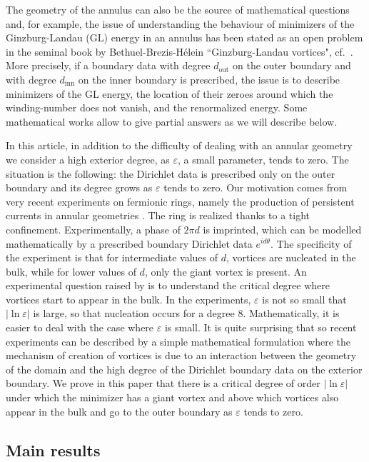\documentclass[12pt,reqno]{amsart}
\def\e {{\varepsilon}}
\numberwithin{equation}{section}
\begin{document}
 The geometry of the annulus can also be the source of mathematical questions and, for example, the issue of understanding the behaviour of minimizers of the Ginzburg-Landau (GL) energy in an annulus has been stated as an open problem in the seminal book by  Bethuel-Brezis-H\'elein  ``Ginzburg-Landau vortices", cf.\ \cite[Problem 3, Chap. XI]{BBH}. More precisely, if a boundary data with degree $d_{\text{out}}$ on the outer boundary and with degree \(d_{\text{inn}}\) on the inner boundary is prescribed, the
 issue is to describe minimizers of the GL energy, the location of their zeroes around which the winding-number does not vanish, and the renormalized energy. Some mathematical works allow to give partial answers as we will describe below. 
  
  In this article, in addition to the difficulty of dealing with an annular geometry we consider a high exterior degree, as $\e$, a small parameter, tends to zero. The situation is the following: the Dirichlet data is prescribed only on the outer boundary and its degree grows as \(\e\) tends to zero. Our motivation comes from very recent experiments on fermionic rings, namely the production of persistent currents in annular geometries \cite{cai2022,Roati}. The ring is realized thanks to a tight confinement. Experimentally, a phase of $2\pi d$  is imprinted, which can be  modelled mathematically by a prescribed boundary Dirichlet data $e^{id\theta}$. The specificity of the experiment is that for intermediate values of $d$, vortices are nucleated in the bulk, while for lower values of $d$, only the giant vortex is present. An experimental question raised by \cite{cai2022,Roati} is to understand the critical degree where vortices start to appear in the bulk. In the experiments, $\e$ is not so small that $|\ln \e|$ is large, so that  nucleation occurs for a degree 8. Mathematically, it is easier to deal with the case where $\e$ is small. It is quite surprising that so recent experiments can be described by a simple mathematical formulation where the mechanism of creation of vortices is due to an interaction between the geometry of the domain and the high degree of the Dirichlet boundary data on the exterior boundary. We prove in this paper that there is a critical degree of order $|\ln \e|$  under which the minimizer has a giant vortex and above which vortices also appear in the bulk and go to the outer boundary as $\e$ tends to zero.
 
 

 
 \subsection{Main results}
\end{document}
